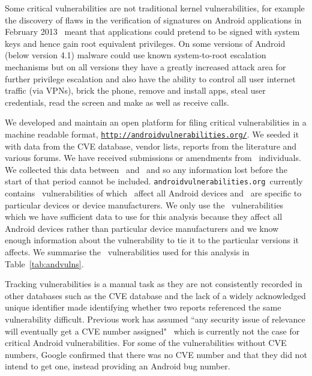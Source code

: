 \documentclass[conference,a4paper,twoside]{IEEEtran}
\let\OldTodo\todo
\renewcommand{\todo}{\OldTodo[inline]}
\newcommand{\todolater}[1]{}%
\newcommand{\avo}{\texttt{androidvulnerabilities.org}}
\begin{document}
Some critical vulnerabilities are not traditional kernel vulnerabilities, for example the discovery of flaws in the verification of signatures on Android applications in February 2013~\cite{Forristal2013} meant that applications could pretend to be signed with system keys and hence gain root equivalent privileges.
On some versions of Android (below version 4.1) malware could use known system-to-root escalation mechanisms but on all versions they have a greatly increased attack area for further privilege escalation and also have the ability to control all user internet traffic (via VPNs), brick the phone, remove and install apps, steal user credentials, read the screen and make as well as receive calls.
\todolater{break vulnerabilities down by attack vector?}
\avoTabAndVulns

We developed and maintain an open platform for filing critical vulnerabilities in a machine readable format, \texttt{\url{http://androidvulnerabilities.org/}}.
We seeded it with data from the CVE database, vendor lists, reports from the literature and various forums.
We have received submissions or amendments from \avoNumSubmitters\ individuals.
We collected this data between \avoStartDate\ and \avoEndDate\ and so any information lost before the start of that period cannot be included.
\avo\ currently contains \avoNumVulnerabilities\ vulnerabilities of which \avoNumVulnAllAndroid\ affect all Android devices and \avoNumVulnSpecific\ are specific to particular devices or device manufacturers.
We only use the \daNumVulnsUsed\ vulnerabilities which we have sufficient data to use for this analysis because they affect all Android devices rather than particular device manufacturers and we know enough information about the vulnerability to tie it to the particular versions it affects.
We summarise the \daNumVulnsUsed\ vulnerabilities used for this analysis in Table~\ref{tab:andvulns}.\todolater{We have published full details of the \daNumVulnsUsed\ vulnerabilities used for this analysis in an accompanying technical report~\cite{TODO}}


Tracking vulnerabilities is a manual task as they are not consistently recorded in other databases such as the CVE database and the lack of a widely acknowledged unique identifier made identifying whether two reports referenced the same vulnerability difficult.
Previous work has assumed ``any security issue of relevance will eventually get a CVE number assigned"~\cite{Frei2010} which is currently not the case for critical Android vulnerabilities.
For some of the vulnerabilities without CVE numbers, Google confirmed that there was no CVE number and that they did not intend to get one, instead providing an Android bug number.
\end{document}
